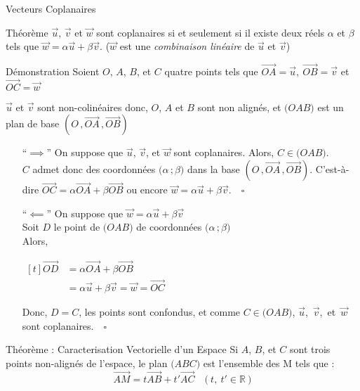 \documentclass{cours}
\begin{document}
\begin{Gpartie}{Vecteurs Coplanaires}
\begin{Spartie}{Théorème}
            $\vec{u}$, $\vec{v}$ et $\vec{w}$ sont coplanaires si et seulement si il existe deux réels $\alpha$ et $\beta$ tels que $\vec{w}=\alpha\vec{u}+\beta\vec{v}$. \quad\big($\vec{w}$ est une \emph{combinaison linéaire} de $\vec{u}$ et $\vec{v}$\big)
            \begin{SSpartie}{Démonstration} 
                Soient $O$, $A$, $B$, et $C$ quatre points tels que $\overrightarrow{OA}=\vec{u},~\overrightarrow{OB}=\vec{v}$ et $\overrightarrow{OC}=\vec{w}$

                $\vec{u}$ et $\vec{v}$ sont non-colinéaires donc, $O$, $A$ et $B$ sont non alignés, et $\big(OAB\big)$ est un plan de base $\left(O\,,\overrightarrow{OA}\,,\overrightarrow{OB}\right)$
                \begin{itemize}[leftmargin=7ex]
                    \item[``$\implies$''] On suppose que $\vec{u}$, $\vec{v}$, et $\vec{w}$ sont coplanaires. Alors, $C\in\big(OAB\big)$. \\ $C$ admet donc des coordonnées $\big(\alpha\,;\beta\big)$ dans la base $\left(O\,,\overrightarrow{OA}\,,\overrightarrow{OB}\right)$. C'est-à-dire $\overrightarrow{OC}=\alpha\overrightarrow{OA}+\beta\overrightarrow{OB}$ ou encore $\vec{w}=\alpha\vec{u}+\beta\vec{v}$.$\quad\square$
                    \item[``$\impliedby$''] On suppose que $\vec{w}=\alpha\vec{u}+\beta\vec{v}$ \\ Soit $D$ le point de $\big(OAB\big)$ de coordonnées $\big(\alpha\,;\beta\big)$ \\ Alors, 
                     
                    $\begin{aligned}[t]
                        \overrightarrow{OD}&=\alpha\overrightarrow{OA}+\beta\overrightarrow{OB} \\
                        &=\alpha\vec{u}+\beta\vec{v}=\vec{w}=\overrightarrow{OC}
                    \end{aligned}$

                    Donc, $D=C$, les points sont confondus, et comme $C\in\big(OAB\big)$, $\vec{u}$,~$\vec{v}$,~et~$\vec{w}$ sont coplanaires.$\quad\square$
                \end{itemize}
            \end{SSpartie}
            \begin{SSpartie}{Théorème : Caracterisation Vectorielle d'un Espace} 
                Si $A$, $B$, et $C$ sont trois points non-alignés de l'espace, le plan $\big(ABC\big)$ est l'ensemble des M tels que : \[\overrightarrow{AM}=t\overrightarrow{AB}+t'\overrightarrow{AC}\quad\big(~t,~t'\in\mathbb{R}~\big)\]
            \end{SSpartie}
        \end{Spartie}
    \end{Gpartie}
\end{document}
